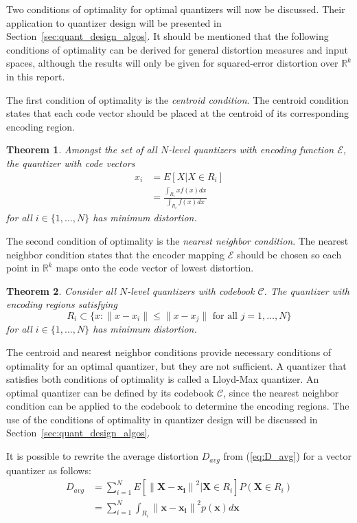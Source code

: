 \documentclass[10pt]{article}
\newtheorem{theorem}{Theorem}[section]
\begin{document}
Two conditions of optimality for optimal quantizers will now be discussed. Their application to quantizer design will be presented in Section~\ref{sec:quant_design_algos}. It should be mentioned that the following conditions of optimality can be derived for general distortion measures and input spaces, although the results will only be given for squared-error distortion over $\mathbb{R}^k$ in this report.

The first condition of optimality is the \emph{centroid condition}. The centroid condition states that each code vector should be placed at the centroid of its corresponding encoding region.

\begin{theorem}
\label{theo:cent_vq}
Amongst the set of all $N$-level quantizers with encoding function $\mathcal{E}$, the quantizer with code vectors
\begin{align}
  \label{eq:cent_vq}
x_i &= E[X | X \in R_i] \\
&= \frac{ \int_{R_i}xf(x)dx }{ \int_{R_i}f(x)dx }
\end{align}
for all $i \in \{1,\ldots,N\}$ has minimum distortion.
\end{theorem}

The second condition of optimality is the \emph{nearest neighbor condition}. The nearest neighbor condition states that the encoder mapping $\mathcal{E}$ should be chosen so each point in $\mathbb{R}^k$ maps onto the code vector of lowest distortion. \begin{theorem}
Consider all $N$-level quantizers with codebook $\mathcal{C}$. The quantizer with encoding regions satisfying
\begin{equation}
R_i \subset \{x : \| x - x_i \| \le \| x - x_j \| \text{ for all } j = 1,\ldots,N \}
\end{equation}
for all $i \in \{1,\ldots,N\}$ has minimum distortion.
\end{theorem}

The centroid and nearest neighbor conditions provide necessary conditions of optimality for an optimal quantizer, but they are not sufficient. A quantizer that satisfies both conditions of optimality is called a Lloyd-Max quantizer.  An optimal quantizer can be defined by its codebook $\mathcal{C}$, since the nearest neighbor condition can be applied to the codebook to determine the encoding regions. The use of the conditions of optimality in quantizer design will be discussed in Section~\ref{sec:quant_design_algos}.

It is possible to rewrite the average distortion $D_{avg}$ from (\ref{eq:D_avg}) for a vector quantizer as follows:
\begin{align}
D_{avg} &= \sum_{i=1}^{N} E[ {\| \mathbf{X} -  \mathbf{x_i}\|}^2 | \mathbf{X} \in R_i] P(\mathbf{X} \in R_i) \\
&= \sum_{i=1}^{N} \int_{R_i} {\|\mathbf{x} - \mathbf{x_i}\|}^2 p(\mathbf{x}) d\mathbf{x}
\end{align}
\end{document}
